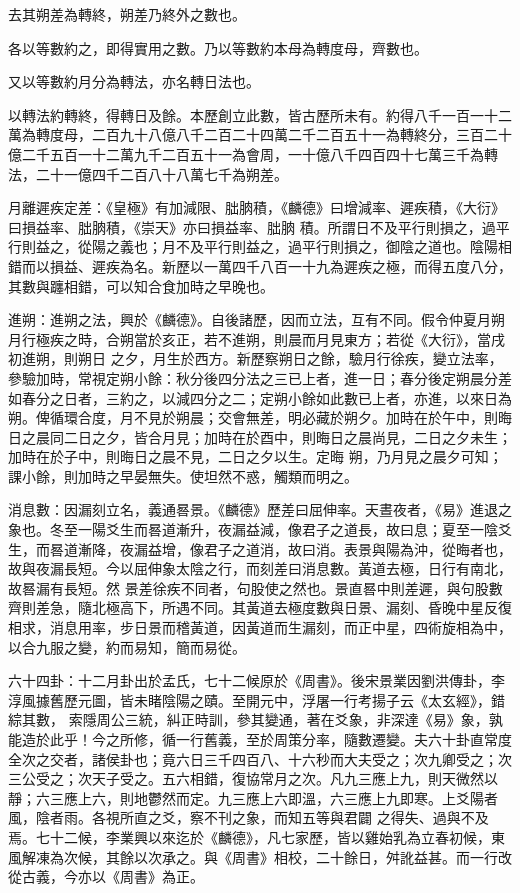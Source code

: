 \begin{pinyinscope}
 去其朔差為轉終，朔差乃終外之數也。



 各以等數約之，即得實用之數。乃以等數約本母為轉度母，齊數也。



 又以等數約月分為轉法，亦名轉日法也。



 以轉法約轉終，得轉日及餘。本歷創立此數，皆古歷所未有。約得八千一百一十二萬為轉度母，二百九十八億八千二百二十四萬二千二百五十一為轉終分，三百二十億二千五百一十二萬九千二百五十一為會周，一十億八千四百四十七萬三千為轉法，二十一億四千二百八十八萬七千為朔差。



 月離遲疾定差：《皇極》有加減限、朏朒積，《麟德》曰增減率、遲疾積，《大衍》曰損益率、朏朒積，《崇天》亦曰損益率、朏朒
 積。所謂日不及平行則損之，過平行則益之，從陽之義也；月不及平行則益之，過平行則損之，御陰之道也。陰陽相錯而以損益、遲疾為名。新歷以一萬四千八百一十九為遲疾之極，而得五度八分，其數與躔相錯，可以知合食加時之早晚也。



 進朔：進朔之法，興於《麟德》。自後諸歷，因而立法，互有不同。假令仲夏月朔月行極疾之時，合朔當於亥正，若不進朔，則晨而月見東方；若從《大衍》，當戌初進朔，則朔日
 之夕，月生於西方。新歷察朔日之餘，驗月行徐疾，變立法率，參驗加時，常視定朔小餘：秋分後四分法之三已上者，進一日；春分後定朔晨分差如春分之日者，三約之，以減四分之二；定朔小餘如此數已上者，亦進，以來日為朔。俾循環合度，月不見於朔晨；交會無差，明必藏於朔夕。加時在於午中，則晦日之晨同二日之夕，皆合月見；加時在於酉中，則晦日之晨尚見，二日之夕未生；加時在於子中，則晦日之晨不見，二日之夕以生。定晦
 朔，乃月見之晨夕可知；課小餘，則加時之早晏無失。使坦然不惑，觸類而明之。



 消息數：因漏刻立名，義通晷景。《麟德》歷差曰屈伸率。天晝夜者，《易》進退之象也。冬至一陽爻生而晷道漸升，夜漏益減，像君子之道長，故曰息；夏至一陰爻生，而晷道漸降，夜漏益增，像君子之道消，故曰消。表景與陽為沖，從晦者也，故與夜漏長短。今以屈伸象太陰之行，而刻差曰消息數。黃道去極，日行有南北，故晷漏有長短。然
 景差徐疾不同者，句股使之然也。景直晷中則差遲，與句股數齊則差急，隨北極高下，所遇不同。其黃道去極度數與日景、漏刻、昏晚中星反復相求，消息用率，步日景而稽黃道，因黃道而生漏刻，而正中星，四術旋相為中，以合九服之變，約而易知，簡而易從。



 六十四卦：十二月卦出於孟氏，七十二候原於《周書》。後宋景業因劉洪傳卦，李淳風據舊歷元圖，皆未睹陰陽之賾。至開元中，浮屠一行考揚子云《太玄經》，錯綜其數，
 索隱周公三統，糾正時訓，參其變通，著在爻象，非深達《易》象，孰能造於此乎！今之所修，循一行舊義，至於周策分率，隨數遷變。夫六十卦直常度全次之交者，諸侯卦也；竟六日三千四百八、十六秒而大夫受之；次九卿受之；次三公受之；次天子受之。五六相錯，復協常月之次。凡九三應上九，則天微然以靜；六三應上六，則地鬱然而定。九三應上六即溫，六三應上九即寒。上爻陽者風，陰者雨。各視所直之爻，察不刊之象，而知五等與君闢
 之得失、過與不及焉。七十二候，李業興以來迄於《麟德》，凡七家歷，皆以雞始乳為立春初候，東風解凍為次候，其餘以次承之。與《周書》相校，二十餘日，舛訛益甚。而一行改從古義，今亦以《周書》為正。




\end{pinyinscope}
